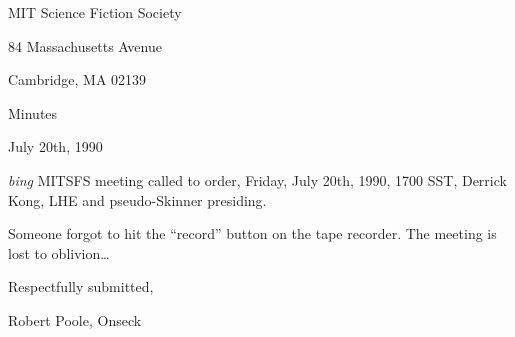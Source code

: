 \setlength{\topmargin}{-0.5in}
\setlength{\oddsidemargin}{0.0in}
\setlength{\evensidemargin}{0.0in}
\setlength{\textheight}{9in}
\setlength{\textwidth}{6.5in}



\begin{center}
MIT Science Fiction Society

84 Massachusetts Avenue

Cambridge, MA 02139

\vspace{0.2in}
Minutes

July 20th, 1990

\end{center}
 
\vspace{0.15in}
{\em bing\/}  MITSFS meeting called to order, Friday, July 20th, 1990,
1700 SST, Derrick Kong, LHE and pseudo-Skinner presiding.

Someone forgot to hit the ``record'' button on the tape recorder.  The meeting
is lost to oblivion\ldots



\vspace{0.15in}
\begin{center}
Respectfully submitted,

Robert Poole, Onseck
\end{center}

